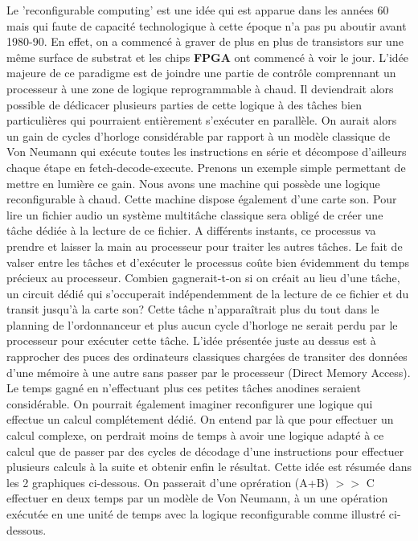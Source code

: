 \vspace{15px}
Le 'reconfigurable computing' est une idée qui est apparue dans les années 60 mais qui faute de capacité technologique à cette époque n'a pas pu aboutir avant 1980-90. En effet, on a commencé à graver de plus en plus de transistors sur une même surface de substrat et les chips {\bf FPGA} ont commencé à voir le jour.
L'idée majeure de ce paradigme est de joindre une partie de contrôle comprennant un processeur à une zone de logique reprogrammable à chaud. Il deviendrait alors possible de dédicacer plusieurs parties de cette logique à des tâches bien particulières qui pourraient entièrement s’exécuter en parallèle. On aurait alors un gain de cycles d'horloge considérable par rapport à un modèle classique de Von Neumann qui exécute toutes les instructions en série et décompose d'ailleurs chaque étape en fetch-decode-execute.
\medskip
Prenons un exemple simple permettant de mettre en lumière ce gain. Nous avons une machine qui possède une logique reconfigurable à chaud. Cette machine dispose également d'une carte son. Pour lire un fichier audio un système multitâche classique sera obligé de créer une tâche dédiée à la lecture de ce fichier. A différents instants, ce processus va prendre et laisser la main au processeur pour traiter les autres tâches. Le fait de valser entre les tâches et d'exécuter le processus coûte bien évidemment du temps précieux au processeur. Combien gagnerait-t-on si on créait au lieu d'une tâche, un circuit dédié qui s'occuperait indépendemment de la lecture de ce fichier et du transit jusqu'à la carte son?
\medskip
Cette tâche n'apparaîtrait plus du tout dans le planning de l'ordonnanceur et plus aucun cycle d'horloge ne serait perdu par le processeur pour exécuter cette tâche. L'idée présentée juste au dessus est à rapprocher des puces des ordinateurs classiques chargées de transiter des données d'une mémoire à une autre sans passer par le processeur (Direct Memory Access).
\medskip
Le temps gagné en n'effectuant plus ces petites tâches anodines seraient considérable. On pourrait également imaginer reconfigurer une logique qui effectue un calcul complétement dédié. On entend par là que pour effectuer un calcul complexe, on perdrait moins de temps à avoir une logique adapté à ce calcul que de passer par des cycles de décodage d'une instructions pour effectuer plusieurs calculs à la suite et obtenir enfin le résultat. Cette idée est résumée dans les 2 graphiques ci-dessous.
\medskip
On passerait d'une oprération (A+B) $>>$ C effectuer en deux temps par un modèle de Von Neumann, à un une opération exécutée en une unité de temps avec la logique reconfigurable comme illustré ci-dessous.
\medskip

